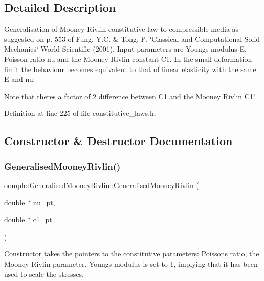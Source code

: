 \subsection{Detailed Description}
Generalisation of Mooney Rivlin constitutive law to compressible media as suggested on p. 553 of Fung, Y.\+C. \& Tong, P. \char`\"{}\+Classical and 
\+Computational Solid Mechanics\char`\"{} World Scientific (2001). Input parameters are Young\textquotesingle{}s modulus E, Poisson ratio nu and the Mooney-\/\+Rivlin constant C1. In the small-\/deformation-\/limit the behaviour becomes equivalent to that of linear elasticity with the same E and nu. 

Note that there\textquotesingle{}s a factor of 2 difference between C1 and the Mooney Rivlin C1! 

Definition at line 225 of file constitutive\+\_\+laws.\+h.



\subsection{Constructor \& Destructor Documentation}
\mbox{\label{classoomph_1_1GeneralisedMooneyRivlin_a04bdac757114843e1b758b64a552c23b}} 
\subsubsection{\texorpdfstring{Generalised\+Mooney\+Rivlin()}{GeneralisedMooneyRivlin()}\hspace{0.1cm}{\footnotesize\ttfamily [1/2]}}
{\footnotesize\ttfamily oomph\+::\+Generalised\+Mooney\+Rivlin\+::\+Generalised\+Mooney\+Rivlin (\begin{DoxyParamCaption}\item[{double $\ast$}]{nu\+\_\+pt,  }\item[{double $\ast$}]{c1\+\_\+pt }\end{DoxyParamCaption})\hspace{0.3cm}{\ttfamily [inline]}}



Constructor takes the pointers to the constitutive parameters\+: Poisson\textquotesingle{}s ratio, the Mooney-\/\+Rivlin parameter. Young\textquotesingle{}s modulus is set to 1, implying that it has been used to scale the stresses. 



